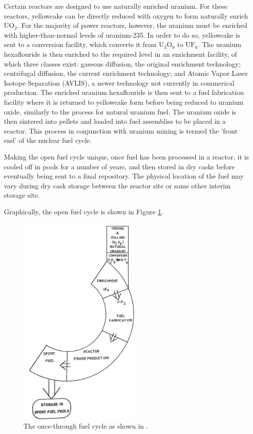 Certain reactors are designed to use naturally enriched uranium. For these
reactors, yellowcake can be directly reduced with oxygen to form naturally
enrich $\mathrm{UO_2}$. For the majority of power reactors, however, the uranium
must be enriched with higher-than-normal levels of uranium-235. In order to do
so, yellowcake is sent to a conversion facility, which converts it from
$\mathrm{U_3O_8}$ to $\mathrm{UF_6}$. The uranium hexaflouride is then enriched
to the required level in an enrichment facility, of which three classes exist:
gaseous diffusion, the original enrichment technology; centrifugal diffusion,
the current enrichment technology; and Atomic Vapor Laser Isotope Separation
(AVLIS), a newer technology not currently in commerical production. The enriched
uranium hexaflouride is then sent to a fuel fabrication facility where it is
returned to yellowcake form before being reduced to uranium oxide, similarly to
the process for natural uranium fuel. The uranium oxide is then sintered into
pellets and loaded into fuel assemblies to be placed in a reactor. This process
in conjunction with uranium mining is termed the 'front end' of the nuclear fuel
cycle.

Making the open fuel cycle unique, once fuel has been processed in a reactor, it
is cooled off in pools for a number of years, and then stored in dry casks
before eventually being sent to a final repository. The physical location of the
fuel may vary during dry cask storage between the reactor site or some other
interim storage site.

Graphically, the open fuel cycle is shown in Figure \ref{fig:open-cycle}.

\begin{figure}[]
  \begin{center}
    \includegraphics[width=6cm]{./chapters/intro/open_cycle.png}
  \caption{The once-through fuel cycle as shown in \cite{cochran1990nuclear}.}
  \label{fig:open-cycle}
  \end{center}
\end{figure}

